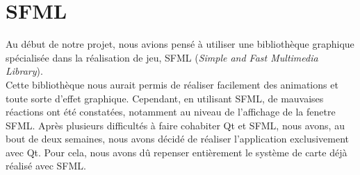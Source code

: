 \section{SFML}

Au début de notre projet, nous avions pensé à utiliser une bibliothèque graphique spécialisée dans la réalisation de jeu, SFML (\textit{Simple and Fast Multimedia Library}).\\

Cette bibliothèque nous aurait permis de réaliser facilement des animations et toute sorte d'effet graphique. 
Cependant, en utilisant SFML, de mauvaises réactions ont été constatées, notamment au niveau de l'affichage de la fenetre SFML.
Après plusieurs difficultés à faire cohabiter Qt et SFML, nous avons, au bout de deux semaines, nous avons décidé de réaliser l'application exclusivement avec Qt. Pour cela, nous avons dû repenser entièrement le système de carte déjà réalisé avec SFML.